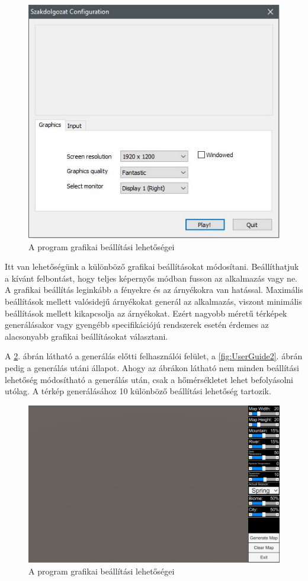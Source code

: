 \begin{figure}[h!]
\centering
\includegraphics[scale=0.5]{kepek/UnityStartUp.jpg}
\caption{A program grafikai beállítási lehetőségei}
\label{fig:UnityStartUp}
\end{figure}

Itt van lehetőségünk a különböző grafikai beállításokat módosítani. Beállíthatjuk a kívánt felbontást, hogy teljes képernyős módban fusson az alkalmazás vagy ne. A grafikai beállítás leginkább a fényekre és az árnyékokra van hatással. Maximális beállítások mellett valósidejű árnyékokat generál az alkalmazás, viszont minimális beállítások mellett kikapcsolja az árnyékokat. Ezért nagyobb méretű térképek generálásakor vagy gyengébb specifikációjú rendszerek esetén érdemes az alacsonyabb grafikai beállításokat választani.

A \ref{fig:UserGuide1}. ábrán látható a generálás előtti felhasználói felület, a \ref{fig:UserGuide2}. ábrán pedig a generálás utáni állapot. Ahogy az ábrákon látható nem minden beállítási lehetőség módosítható a generálás után, csak a hőmérsékletet lehet befolyásolni utólag. A térkép generálásához 10 különböző beállítási lehetőség tartozik.

\begin{figure}[h!]
\centering
\includegraphics[scale=0.215]{kepek/UserGuide1.jpg}
\caption{A program grafikai beállítási lehetőségei}
\label{fig:UserGuide1}
\end{figure}

